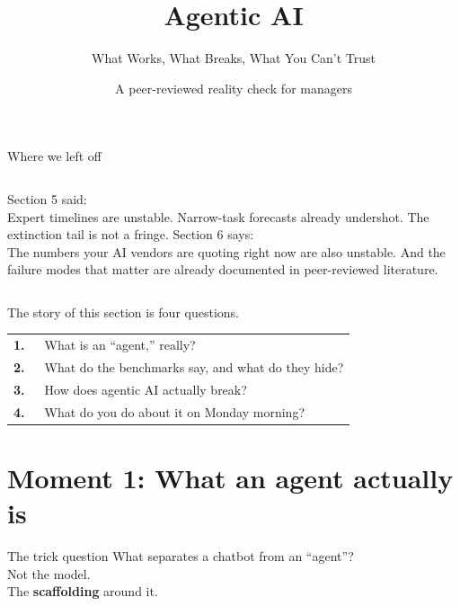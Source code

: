 \documentclass[aspectratio=169, 12pt, xcolor={dvipsnames,table}]{beamer}
\title{Agentic AI}
\subtitle{What Works, What Breaks, What You Can't Trust}
\author{\small A peer-reviewed reality check for managers}
\date{}
\begin{document}
\begin{frame}[plain]
  \titlepage
\end{frame}

\begin{frame}{Where we left off}
  \vfill
  \begin{columns}[T]
    {\large Section 5 said:}\\[0.5em]
    {\color{mute}Expert timelines are unstable. Narrow-task forecasts already undershot. The extinction tail is not a fringe.}
    {\large Section 6 says:}\\[0.5em]
    {\color{mute}The numbers your AI vendors are quoting right now are also unstable. And the failure modes that matter are already documented in peer-reviewed literature.}
  \end{columns}
  \vfill
\end{frame}

\begin{frame}[plain]
  \centering\vfill
  {\color{mute}\large The story of this section is four questions.}\\[2em]
  \begin{tabular}{rl}
    \color{accent}\bfseries 1.~ & What is an ``agent,'' really?\\[0.3em]
    \color{accent}\bfseries 2.~ & What do the benchmarks say, and what do they hide?\\[0.3em]
    \color{accent}\bfseries 3.~ & How does agentic AI actually break?\\[0.3em]
    \color{accent}\bfseries 4.~ & What do you do about it on Monday morning?\\
  \end{tabular}
  \vfill
\end{frame}

\section{Moment 1: What an agent actually is}

\begin{frame}{The trick question}
  \vfill
  \centering
  {\Large What separates a chatbot from an ``agent''?}\\[1.5em]
  {\large Not the model.}\\[0.6em]
  {\large The {\color{accent}\bfseries scaffolding} around it.}
  \vfill
\end{frame}
\end{document}
